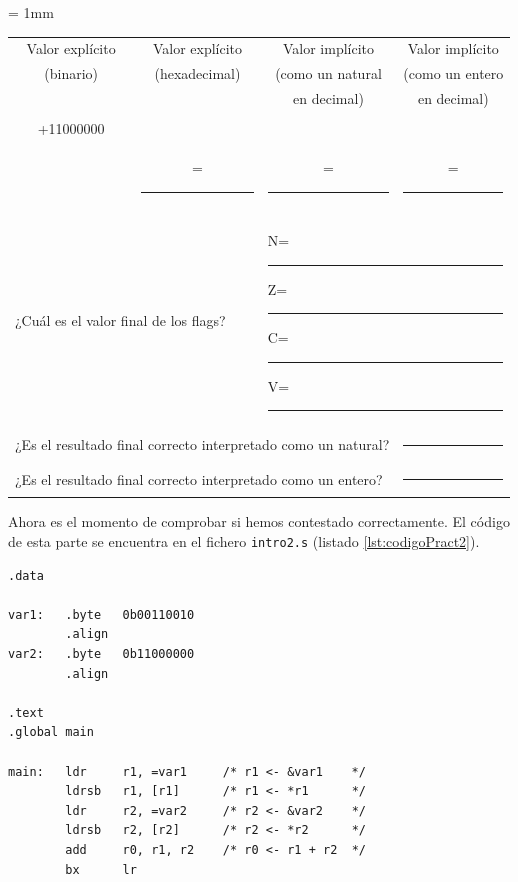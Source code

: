 \begin{center}
\small
\colorbox[gray]{0.9}{
\tabcolsep = 1mm
\begin{tabular}{cccc}
Valor explícito & Valor explícito & Valor implícito & Valor implícito \\
(binario) & (hexadecimal) & (como un natural & (como un entero \\
& & en decimal) & en decimal) \\
\colorbox[gray]{1}{
\begin{minipage}[b]{2cm}
\begin{flushright}
00110010\\
+11000000\\[-3mm]
\hrulefill
\end{flushright}
\vspace{0.4cm}
\end{minipage}
} &
= \colorbox[gray]{1}{\rule{0cm}{0.46cm}\rule{2cm}{0cm}} &
= \colorbox[gray]{1}{\rule{0cm}{0.46cm}\rule{2cm}{0cm}} &
= \colorbox[gray]{1}{\rule{0cm}{0.46cm}\rule{2cm}{0cm}} \\
\\
\multicolumn{2}{l}{
¿Cuál es el valor final de los flags?} &
\multicolumn{2}{l}{
\colorbox[gray]{1}{\rule{0cm}{0.46cm}N=\rule{0.7cm}{0cm}Z=\rule{0.7cm}{0cm}C=\rule{0.7cm}{0cm}V=\rule{0.7cm}{0cm}}
}\\[1mm]
\multicolumn{3}{l}{
¿Es el resultado final correcto interpretado como un natural?} &
\multicolumn{1}{l}{
\colorbox[gray]{1}{\rule{1cm}{0cm}\rule{0cm}{0.46cm}}} \\[1mm]
\multicolumn{3}{l}{
¿Es el resultado final correcto interpretado como un entero?} &
\multicolumn{1}{l}{
\colorbox[gray]{1}{\rule{1cm}{0cm}\rule{0cm}{0.46cm}}} \\
\end{tabular}
}
\end{center}

Ahora es el momento de comprobar si hemos contestado correctamente.
El código de esta parte se encuentra en el fichero {\tt intro2.s}
(listado \ref{lst:codigoPract2}).

\begin{lstlisting}[caption={Código del programa intro2.s},label={lst:codigoPract2}]
.data

var1:   .byte   0b00110010
        .align
var2:   .byte   0b11000000
        .align

.text
.global main
 
main:   ldr     r1, =var1     /* r1 <- &var1    */
        ldrsb   r1, [r1]      /* r1 <- *r1      */
        ldr     r2, =var2     /* r2 <- &var2    */
        ldrsb   r2, [r2]      /* r2 <- *r2      */
        add     r0, r1, r2    /* r0 <- r1 + r2  */
        bx      lr
\end{lstlisting}

